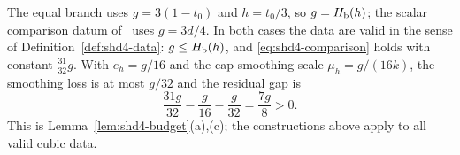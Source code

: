 \begin{remark}\label{rem:fer-lean}
The equal branch uses $g=3(1-t_0)$ and $h=t_0/3$, so $g=H_{\mathrm b}(h)$; the scalar comparison datum of~\cite{SongHD}
uses $g=3d/4$. In both cases the data are valid in the sense of Definition~\ref{def:shd4-data}: $g\le H_{\mathrm b}(h)$, and \eqref{eq:shd4-comparison} holds with constant $\frac{31}{32}g$. With
$e_h=g/16$ and the cap smoothing scale $\mu_h=g/(16k)$, the smoothing loss is at most $g/32$ and the residual gap is
\[
 \frac{31g}{32}-\frac g{16}-\frac g{32}=\frac{7g}{8}>0.
\]
This is Lemma~\ref{lem:shd4-budget}(a),(c); the constructions above apply to all valid cubic data.
\end{remark}
